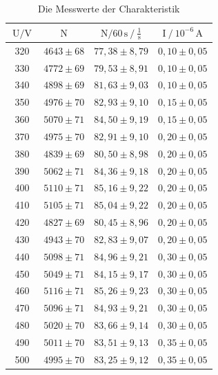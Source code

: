 \begin{table}[H]
    \centering
    \caption{Die Messwerte der Charakteristik} 
    \label{Tabelle1}
    \begin{tabular} {c  c  c  c}
        \toprule
        {$ \text{U} \mathbin{/} \unit{\volt}$} &
        {$ \text{N} $} &
        {$ \text{N}/ 60\,\unit{\second} \mathbin{/} \frac{1}{\unit{\second}} $} &
        {$ \text{I} \mathbin{/} 10^{-6}\,\unit{\ampere} $} \\
        \midrule
        320 & $ 4643 \pm 68 $ & $ 77,38 \pm 8,79 $ & $ 0,10 \pm 0,05 $  \\
        330 & $ 4772 \pm 69 $ & $ 79,53 \pm 8,91 $ & $ 0,10 \pm 0,05 $  \\
        340 & $ 4898 \pm 69 $ & $ 81,63 \pm 9,03 $ & $ 0,10 \pm 0,05 $  \\
        350 & $ 4976 \pm 70 $ & $ 82,93 \pm 9,10 $ & $ 0,15 \pm 0,05 $  \\
        360 & $ 5070 \pm 71 $ & $ 84,50 \pm 9,19 $ & $ 0,15 \pm 0,05 $  \\
        370 & $ 4975 \pm 70 $ & $ 82,91 \pm 9,10 $ & $ 0,20 \pm 0,05 $  \\
        380 & $ 4839 \pm 69 $ & $ 80,50 \pm 8,98 $ & $ 0,20 \pm 0,05 $  \\
        390 & $ 5062 \pm 71 $ & $ 84,36 \pm 9,18 $ & $ 0,20 \pm 0,05 $  \\
        400 & $ 5110 \pm 71 $ & $ 85,16 \pm 9,22 $ & $ 0,20 \pm 0,05 $  \\
        410 & $ 5105 \pm 71 $ & $ 85,04 \pm 9,22 $ & $ 0,20 \pm 0,05 $  \\
        420 & $ 4827 \pm 69 $ & $ 80,45 \pm 8,96 $ & $ 0,20 \pm 0,05 $  \\
        430 & $ 4943 \pm 70 $ & $ 82,83 \pm 9,07 $ & $ 0,20 \pm 0,05 $  \\
        440 & $ 5098 \pm 71 $ & $ 84,96 \pm 9,21 $ & $ 0,30 \pm 0,05 $  \\
        450 & $ 5049 \pm 71 $ & $ 84,15 \pm 9,17 $ & $ 0,30 \pm 0,05 $  \\
        460 & $ 5116 \pm 71 $ & $ 85,26 \pm 9,23 $ & $ 0,30 \pm 0,05 $  \\
        470 & $ 5096 \pm 71 $ & $ 84,93 \pm 9,21 $ & $ 0,30 \pm 0,05 $  \\
        480 & $ 5020 \pm 70 $ & $ 83,66 \pm 9,14 $ & $ 0,30 \pm 0,05 $  \\
        490 & $ 5011 \pm 70 $ & $ 83,51 \pm 9,13 $ & $ 0,35 \pm 0,05 $  \\
        500 & $ 4995 \pm 70 $ & $ 83,25 \pm 9,12 $ & $ 0,35 \pm 0,05 $  \\

\end{tabular}
\end{table}
